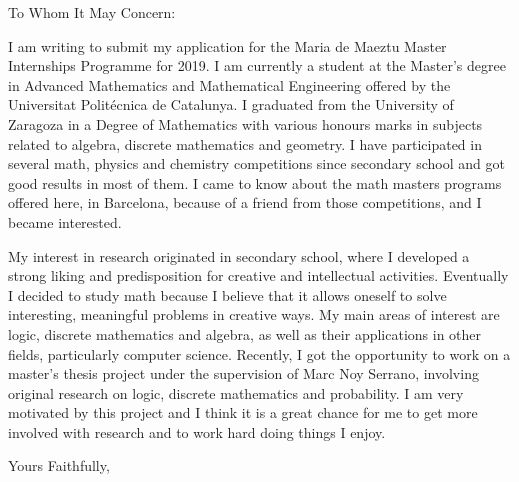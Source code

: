 \documentclass{letter}
\begin{document}
	\begin{letter}{}
		\opening{To Whom It May Concern:}
		\vspace{1cm}
		I am writing to submit my application for the Maria de Maeztu Master Internships Programme for
		2019. I am currently a student at the Master's degree in Advanced Mathematics and Mathematical
		Engineering offered by the Universitat Politécnica de Catalunya. I graduated from the University of
		Zaragoza in a Degree of Mathematics with various honours marks in subjects related to algebra, 
		discrete mathematics and geometry. I have participated in several math, physics and chemistry competitions 
		since secondary school and got good results in most of them.
		I came to know about the math masters programs offered here, in Barcelona, because of a friend 
		from those competitions, and I became interested. \par
	    My interest in research originated in secondary school, where I developed a strong liking and predisposition for
	    creative and intellectual activities. 
	    Eventually I decided to study math because I believe that it allows oneself to solve interesting, meaningful 
	    problems in creative ways. My main areas of interest are logic, discrete mathematics and algebra, 
	    as well as their applications in other fields, particularly computer science.  
		Recently, I got the opportunity to work on a master's thesis project under the supervision of Marc Noy Serrano,
		involving original research on logic, discrete mathematics and probability. I am very motivated by this project and I think
		it is a great chance for me to get more involved with research and to work hard doing things I enjoy.  
		
		
		\closing{Yours Faithfully,}
		
	
	\end{letter}
\end{document}
